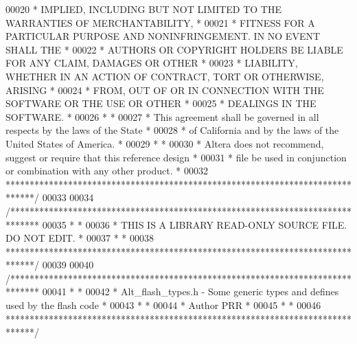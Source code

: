 \begin{DoxyCode}
00020 \textcolor{comment}{* IMPLIED, INCLUDING BUT NOT LIMITED TO THE WARRANTIES OF MERCHANTABILITY,    *}
00021 \textcolor{comment}{* FITNESS FOR A PARTICULAR PURPOSE AND NONINFRINGEMENT. IN NO EVENT SHALL THE *}
00022 \textcolor{comment}{* AUTHORS OR COPYRIGHT HOLDERS BE LIABLE FOR ANY CLAIM, DAMAGES OR OTHER      *}
00023 \textcolor{comment}{* LIABILITY, WHETHER IN AN ACTION OF CONTRACT, TORT OR OTHERWISE, ARISING     *}
00024 \textcolor{comment}{* FROM, OUT OF OR IN CONNECTION WITH THE SOFTWARE OR THE USE OR OTHER         *}
00025 \textcolor{comment}{* DEALINGS IN THE SOFTWARE.                                                   *}
00026 \textcolor{comment}{*                                                                             *}
00027 \textcolor{comment}{* This agreement shall be governed in all respects by the laws of the State   *}
00028 \textcolor{comment}{* of California and by the laws of the United States of America.              *}
00029 \textcolor{comment}{*                                                                             *}
00030 \textcolor{comment}{* Altera does not recommend, suggest or require that this reference design    *}
00031 \textcolor{comment}{* file be used in conjunction or combination with any other product.          *}
00032 \textcolor{comment}{******************************************************************************/}
00033 
00034 \textcolor{comment}{/******************************************************************************}
00035 \textcolor{comment}{*                                                                             *}
00036 \textcolor{comment}{* THIS IS A LIBRARY READ-ONLY SOURCE FILE. DO NOT EDIT.                       *}
00037 \textcolor{comment}{*                                                                             *}
00038 \textcolor{comment}{******************************************************************************/}
00039 
00040 \textcolor{comment}{/******************************************************************************}
00041 \textcolor{comment}{*                                                                             *}
00042 \textcolor{comment}{* Alt\_flash\_types.h - Some generic types and defines used by the flash code   *}
00043 \textcolor{comment}{*                                                                             *}
00044 \textcolor{comment}{* Author PRR                                                                  *}
00045 \textcolor{comment}{*                                                                             *}
00046 \textcolor{comment}{******************************************************************************/}

\end{DoxyCode}
